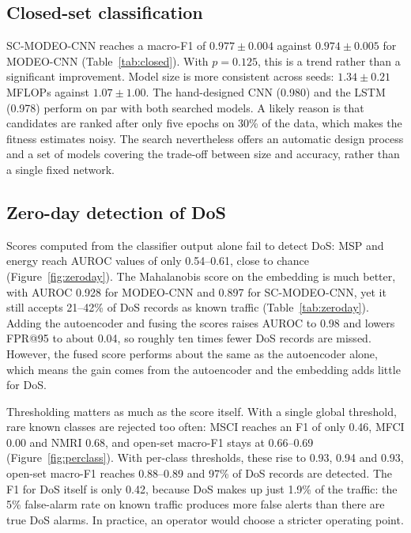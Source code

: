 \documentclass[10pt,twocolumn,letterpaper]{article}
\begin{document}
\subsection{Closed-set classification}
SC-MODEO-CNN reaches a macro-F1 of $0.977 \pm 0.004$ against
$0.974 \pm 0.005$ for MODEO-CNN (Table~\ref{tab:closed}). With $p = 0.125$,
this is a trend rather than a significant improvement. Model size is more
consistent across seeds: $1.34 \pm 0.21$ MFLOPs against $1.07 \pm 1.00$.
The hand-designed CNN (0.980) and the LSTM (0.978) perform on par with
both searched models. A likely reason is that candidates are ranked after
only five epochs on 30\% of the data, which makes the fitness estimates
noisy. The search nevertheless offers an automatic design process and a
set of models covering the trade-off between size and accuracy, rather
than a single fixed network.





\subsection{Zero-day detection of DoS}
Scores computed from the classifier output alone fail to detect DoS: MSP
and energy reach AUROC values of only 0.54--0.61, close to chance
(Figure~\ref{fig:zeroday}). The Mahalanobis score on the embedding is much
better, with AUROC 0.928 for MODEO-CNN and 0.897 for SC-MODEO-CNN, yet it
still accepts 21--42\% of DoS records as known traffic
(Table~\ref{tab:zeroday}). Adding the autoencoder and fusing the scores
raises AUROC to 0.98 and lowers FPR@95 to about 0.04, so roughly ten times
fewer DoS records are missed. However, the fused score performs about the
same as the autoencoder alone, which means the gain comes from the
autoencoder and the embedding adds little for DoS.

Thresholding matters as much as the score itself. With a single global
threshold, rare known classes are rejected too often: MSCI reaches an F1
of only 0.46, MFCI 0.00 and NMRI 0.68, and open-set macro-F1 stays at
0.66--0.69 (Figure~\ref{fig:perclass}). With per-class thresholds, these
rise to 0.93, 0.94 and 0.93, open-set macro-F1 reaches 0.88--0.89 and 97\%
of DoS records are detected. The F1 for DoS itself is only 0.42, because
DoS makes up just 1.9\% of the traffic: the 5\% false-alarm rate on known
traffic produces more false alerts than there are true DoS alarms. In
practice, an operator would choose a stricter operating point.
\end{document}
